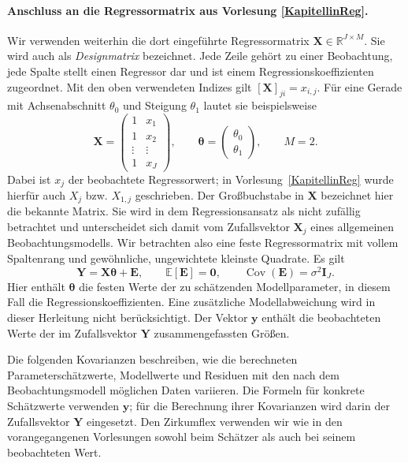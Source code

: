\paragraph{Anschluss an die Regressormatrix aus Vorlesung \ref{KapitellinReg}.}
Wir verwenden weiterhin die dort eingeführte Regressormatrix
$\mathbf X\in\mathbb R^{J\times M}$. Sie wird auch als
\textsl{Designmatrix} bezeichnet. Jede Zeile gehört zu einer Beobachtung,
jede Spalte stellt einen Regressor dar und ist einem Regressionskoeffizienten zugeordnet. Mit den oben verwendeten
Indizes gilt $[\mathbf X]_{ji}=x_{i,j}$. Für eine Gerade mit
Achsenabschnitt $\theta_0$ und Steigung $\theta_1$ lautet sie beispielsweise
\begin{equation}
\mathbf X=
\begin{pmatrix}
1&x_1\\
1&x_2\\
\vdots&\vdots\\
1&x_J
\end{pmatrix},
\qquad
\boldsymbol\theta=\begin{pmatrix}\theta_0\\\theta_1\end{pmatrix},
\qquad M=2.
\label{KonzepteRegressormatrix}
\end{equation}
Dabei ist $x_j$ der beobachtete Regressorwert; in Vorlesung~\ref{KapitellinReg} wurde
hierfür auch $X_j$ bzw. $X_{1,j}$ geschrieben. Der Großbuchstabe in
$\mathbf X$ bezeichnet hier die bekannte Matrix. Sie wird in 
dem Regressionsansatz als nicht zufällig betrachtet und unterscheidet sich damit vom Zufallsvektor $\mathbf X_j$ eines allgemeinen Beobachtungsmodells. Wir betrachten also eine feste Regressormatrix mit vollem Spaltenrang und
gewöhnliche, ungewichtete kleinste Quadrate. Es gilt
\begin{equation}
\mathbf Y=\mathbf X\boldsymbol\theta+\mathbf E,
\qquad
\mathbb E[\mathbf E]=\mathbf0,
\qquad
\operatorname{Cov}(\mathbf E)=\sigma^2\mathbf I_J.
\label{KonzepteLinearesVektormodell}
\end{equation}
Hier enthält $\boldsymbol\theta$ die festen Werte der zu schätzenden
Modellparameter, in diesem Fall die Regressionskoeffizienten.
Eine zusätzliche Modellabweichung wird in dieser Herleitung nicht
berücksichtigt. Der Vektor $\mathbf y$ enthält die beobachteten Werte der im
Zufallsvektor $\mathbf Y$ zusammengefassten Größen.

Die folgenden Kovarianzen beschreiben, wie die
berechneten Parameterschätzwerte, Modellwerte und Residuen mit den
nach dem Beobachtungsmodell möglichen Daten variieren.
Die Formeln für konkrete Schätzwerte verwenden $\mathbf y$; für die
Berechnung ihrer Kovarianzen wird darin der Zufallsvektor $\mathbf Y$
eingesetzt. Den Zirkumflex verwenden wir wie in den vorangegangenen
Vorlesungen sowohl beim Schätzer als auch bei seinem beobachteten Wert.


